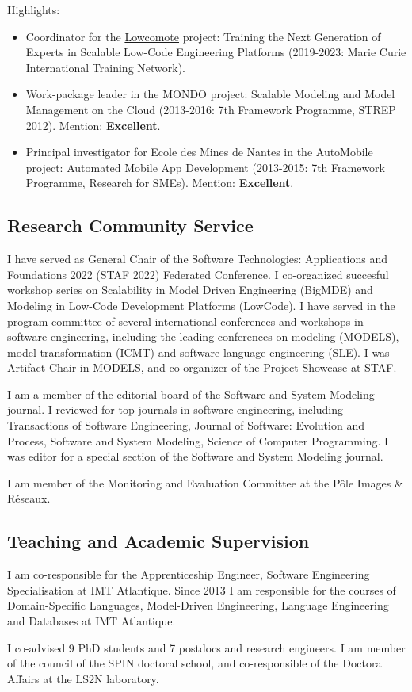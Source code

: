 \medskip
Highlights:
 \begin{itemize}
 \item Coordinator for the \href{https://www.lowcomote.eu/}{Lowcomote} project: Training the Next Generation of Experts in Scalable Low-Code Engineering Platforms (2019-2023: Marie Curie International Training Network).
 \item Work-package leader in the MONDO project: Scalable Modeling and Model Management on the Cloud (2013-2016: 7th Framework Programme, STREP 2012). Mention: \textbf{Excellent}.
 \item Principal investigator for Ecole des Mines de Nantes in the AutoMobile project: Automated Mobile App Development (2013-2015: 7th Framework Programme, Research for SMEs). Mention: \textbf{Excellent}.
\end{itemize}

\subsection*{Research Community Service}

I have served as General Chair of the Software Technologies: Applications and Foundations 2022 (STAF 2022) Federated Conference. I co-organized succesful workshop series on Scalability in Model Driven Engineering (BigMDE) and Modeling in Low-Code Development Platforms (LowCode). 
I have served in the program committee of several international conferences and workshops in software engineering, including the leading conferences on modeling (MODELS), model transformation (ICMT) and software language engineering (SLE). I was Artifact Chair in MODELS, and co-organizer of the Project Showcase at STAF.

I am a member of the editorial board of the Software and System Modeling journal. I reviewed for top journals in software engineering, including Transactions of Software Engineering, Journal of Software: Evolution and Process, Software and System Modeling, Science of Computer Programming. I was editor for a special section of the Software and System Modeling journal.

I am member of the Monitoring and Evaluation Committee at the Pôle Images \& Réseaux.

\subsection*{Teaching and Academic Supervision}

I am co-responsible for the Apprenticeship Engineer, Software Engineering Specialisation at IMT Atlantique. Since 2013 I am responsible for the courses of Domain-Specific Languages, Model-Driven Engineering, Language Engineering and Databases at IMT Atlantique.

I co-advised 9 PhD students and 7 postdocs and research engineers. I am member of the council of the SPIN doctoral school, and co-responsible of the Doctoral Affairs at the LS2N laboratory.

